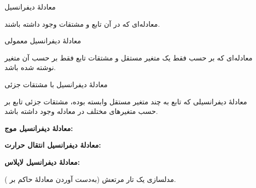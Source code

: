 \EMhold


\begin{EMdefinition}{معادلهٔ دیفرانسیل}

معادله‌ای که در آن تابع و مشتقات وجود داشته باشند.

\end{EMdefinition}

\begin{EMdefinition}{معادلهٔ دیفرانسیل معمولی}

معادله‌ای که بر حسب فقط یک متغیر مستقل و مشتقات تابع فقط بر حسب آن متغیر نوشته شده باشد.

\end{EMdefinition}

\begin{EMdefinition}{معادلهٔ دیفرانسیل با مشتقات جزئی}

معادلهٔ دیفرانسیلی که تابع به چند متغیر مستقل وابسته بوده، مشتقات جزئی تابع بر حسب متغیرهای مختلف در معادله وجود داشته باشد.

\end{EMdefinition}

\textbf{معادلهٔ دیفرانسیل موج:}

\textbf{معادلهٔ دیفرانسیل انتقال حرارت:}

\textbf{معادلهٔ دیفرانسیل لاپلاس:}


مدلسازی یک تار مرتعش (به‌دست آوردن معادلهٔ حاکم بر ).

